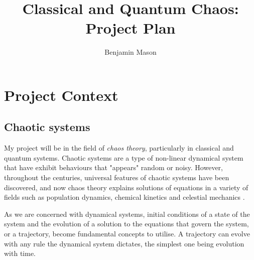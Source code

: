 \documentclass[12pt,a4paper]{amsart}
\title{Classical and Quantum Chaos: Project Plan}
\author{Benjamin Mason}
\begin{document}
\maketitle









\section{Project Context}

\subsection{Chaotic systems}
My project will be in the field of \textit{chaos theory}, particularly in classical and quantum systems. Chaotic systems are a type of non-linear dynamical system that have exhibit behaviours that "appears" random or noisy. However, throughout the centuries, universal features of chaotic systems have been discovered, and now chaos theory explains solutions of equations in a variety of fields such as population dynamics, chemical kinetics and celestial mechanics \cite{chaosARUN}.

As we are concerned with dynamical systems, initial conditions of a state of the system and the evolution of a solution to the equations that govern the system, or a trajectory, become fundamental concepts to utilise. A trajectory can evolve with any rule the dynamical system dictates, the simplest one being evolution with time.
\end{document}
